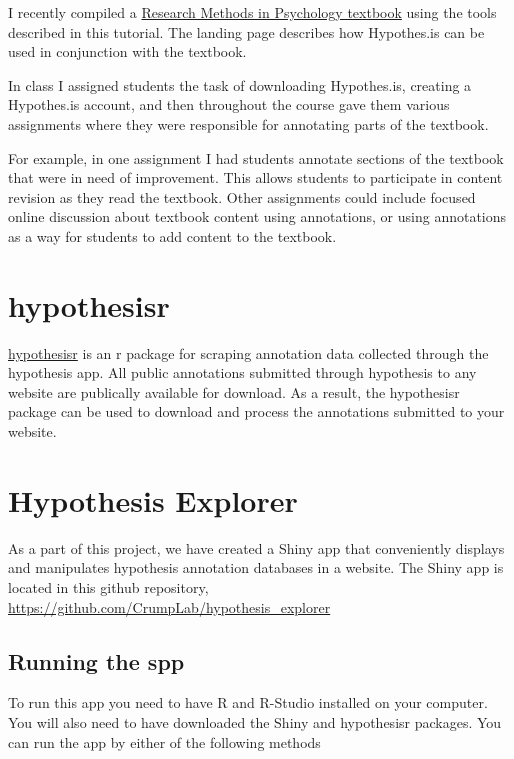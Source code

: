 \documentclass[]{book}
\theoremstyle{definition}
\theoremstyle{definition}
\theoremstyle{definition}
\theoremstyle{remark}
\begin{document}
I recently compiled a
\href{http://crumplab.github.io/ResearchMethods/}{Research Methods in
Psychology textbook} using the tools described in this tutorial. The
landing page describes how Hypothes.is can be used in conjunction with
the textbook.

In class I assigned students the task of downloading Hypothes.is,
creating a Hypothes.is account, and then throughout the course gave them
various assignments where they were responsible for annotating parts of
the textbook.

For example, in one assignment I had students annotate sections of the
textbook that were in need of improvement. This allows students to
participate in content revision as they read the textbook. Other
assignments could include focused online discussion about textbook
content using annotations, or using annotations as a way for students to
add content to the textbook.

\section{hypothesisr}\label{hypothesisr}

\href{https://github.com/mdlincoln/hypothesisr}{hypothesisr} is an r
package for scraping annotation data collected through the hypothesis
app. All public annotations submitted through hypothesis to any website
are publically available for download. As a result, the hypothesisr
package can be used to download and process the annotations submitted to
your website.

\section{Hypothesis Explorer}\label{hypothesis-explorer}

As a part of this project, we have created a Shiny app that conveniently
displays and manipulates hypothesis annotation databases in a website.
The Shiny app is located in this github repository,
\url{https://github.com/CrumpLab/hypothesis_explorer}

\subsection{Running the spp}\label{running-the-spp}

To run this app you need to have R and R-Studio installed on your
computer. You will also need to have downloaded the Shiny and
hypothesisr packages. You can run the app by either of the following
methods
\end{document}
